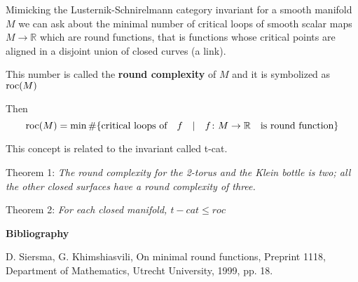 \documentclass[12pt]{article}
\begin{document}
Mimicking the Lusternik-Schnirelmann category invariant for a smooth manifold $M$ we can ask about the minimal number of critical loops of smooth scalar maps $M\to\mathbb{R}$ which are round functions, that is functions whose critical points are aligned in  a disjoint union of closed curves (a link). 

This number is called the {\bf round complexity} of $M$ and it is symbolized as ${\rm roc}(M)$

Then 
$${\rm roc}(M)=\min\#\{\mbox{critical loops of\quad}f\quad|\quad f\colon M \to\mathbb{R}\quad \mbox{is round function}\}$$

This concept is related to the invariant called t-cat.

Theorem 1: {\it The round complexity for the 2-torus and the Klein bottle is two; all the other closed surfaces have a round complexity of three.} 

Theorem 2: {\it For each closed manifold, $t-cat\le roc$}


{\bf Bibliography}

D. Siersma, G. Khimshiasvili, On minimal round functions, Preprint 1118, Department of Mathematics, Utrecht University, 1999, pp. 18. 



\end{document}
